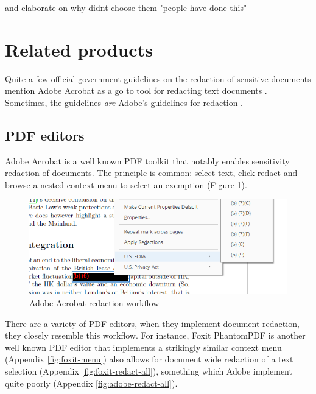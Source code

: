 \documentclass{l4proj}
\begin{document}
and elaborate on why didnt choose them
"people have done this"

\section{Related products}

Quite a few official government guidelines on the redaction of sensitive documents mention Adobe Acrobat as a go to tool for redacting text documents \autocite{thenationalarchivesRedactionToolkitPaper2016}.
Sometimes, the guidelines \textit{are} Adobe's guidelines for redaction \autocite{scottishgovernmentRedactingInformation2019}.

\subsection{PDF editors}

Adobe Acrobat is a well known PDF toolkit that notably enables sensitivity redaction of documents.
The principle is common: select text, click redact and browse a nested context menu to select an exemption (Figure \ref{fig:adobe-redaction}).

\begin{figure}[H]
    \centering
    \includegraphics[width=\linewidth]{images/adobe_redaction.png}
    \caption{Adobe Acrobat redaction workflow}
    \label{fig:adobe-redaction}
\end{figure}

There are a variety of PDF editors, when they implement document redaction, they closely resemble this workflow.
For instance, Foxit PhantomPDF is another well known PDF editor that implements a strikingly similar context menu (Appendix \ref{fig:foxit-menu}) also allows for document wide redaction of a text selection (Appendix \ref{fig:foxit-redact-all}), something which Adobe implement quite poorly (Appendix \ref{fig:adobe-redact-all}).

\end{document}
